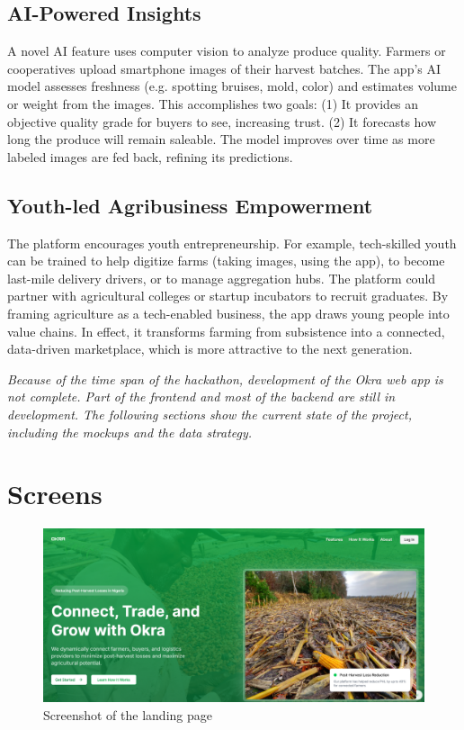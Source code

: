 {\subsection{AI-Powered Insights}
A novel AI feature uses computer vision to analyze produce quality. Farmers or cooperatives upload smartphone images of their harvest batches. The app’s AI model assesses freshness (e.g. spotting bruises, mold, color) and estimates volume or weight from the images. This accomplishes two goals: (1) It provides an objective quality grade for buyers to see, increasing trust. (2) It forecasts how long the produce will remain saleable. The model improves over time as more labeled images are fed back, refining its predictions.

\subsection{Youth-led Agribusiness Empowerment}
The platform encourages youth entrepreneurship. For example, tech-skilled youth can be trained to help digitize farms (taking images, using the app), to become last-mile delivery drivers, or to manage aggregation hubs. The platform could partner with agricultural colleges or startup incubators to recruit graduates. By framing agriculture as a tech-enabled business, the app draws young people into value chains. In effect, it transforms farming from subsistence into a connected, data-driven marketplace, which is more attractive to the next generation.

\begin{block}[note]
    \textit{Because of the time span of the hackathon, development of the Okra web app is not complete. Part of the frontend and most of the backend are still in development. The following sections show the current state of the project, including the mockups and the data strategy.}
    \end{block}


\section{Screens}


\begin{figure}[H]
    \centering
    \includegraphics[scale=0.3]{Figures/okra_mockup_landing.png}
    \caption{Screenshot of the landing page}
    \label{fig:figure-05}
\end{figure}


}
